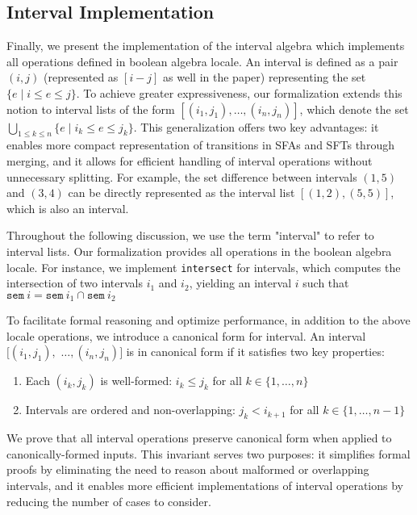 \subsection{Interval Implementation}

Finally, we present the implementation of the interval algebra which implements all operations defined in boolean algebra locale.
An interval is defined as a pair $(i, j)$ (represented as $[i-j]$ as well in the paper) representing the set $\{e \mid i \leq e \leq j\}$. To achieve greater expressiveness, our formalization extends this notion to interval lists of the form $[(i_1, j_1), \ldots, (i_n, j_n)]$, which denote the set $\bigcup_{1\leq k\leq n}\{e \mid i_k \leq e \leq j_k\}$. This generalization offers two key advantages: it enables more compact representation of transitions in SFAs and SFTs through merging, and it allows for efficient handling of interval operations without unnecessary splitting. For example, the set difference between intervals $(1, 5)$ and $(3, 4)$ can be directly represented as the interval list $[(1, 2), (5, 5)]$, which is also an interval.


Throughout the following discussion, we use the term "interval" to refer to interval lists. Our formalization provides all operations in the boolean algebra locale. For instance, we implement \texttt{intersect} for intervals, which computes the intersection of two intervals $i_1$ and $i_2$, yielding an interval $i$ such that $\texttt{sem}~i = \texttt{sem}~i_1 \cap \texttt{sem}~i_2$

To facilitate formal reasoning and optimize performance, in addition to the above locale operations, we introduce a canonical form for interval. An interval $[(i_1, j_1), $ $\ldots, (i_n, j_n)]$ is in canonical form if it satisfies two key properties:
\begin{enumerate}
  \item Each $(i_k, j_k)$ is well-formed: $i_k \leq j_k$ for all $k \in \{1,\ldots,n\}$
  \item Intervals are ordered and non-overlapping: $j_k < i_{k+1}$ for all $k \in \{1,\ldots,n-1\}$
\end{enumerate}

We prove that all interval operations preserve canonical form when applied to canonically-formed inputs. This invariant serves two purposes: it simplifies formal proofs by eliminating the need to reason about malformed or overlapping intervals, and it enables more efficient implementations of interval operations by reducing the number of cases to consider.
